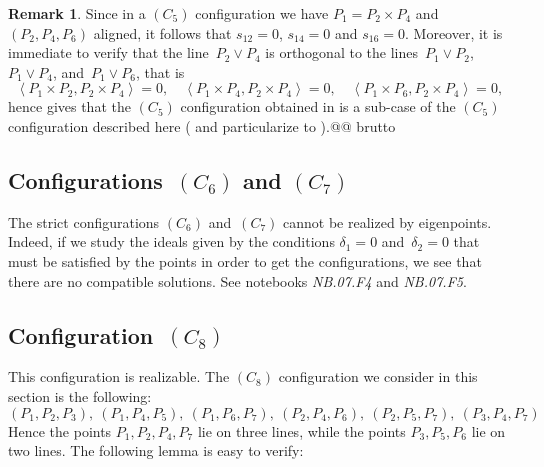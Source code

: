 \documentclass[a4paper, 11pt, reqno]{amsart}
\theoremstyle{plain}
\theoremstyle{definition}
\newtheorem{rmk}[lemma]{Remark}
\newcommand{\nb}[2]{\textsl{{NB}.{#1}.{#2}}}
\newcommand{\scl}[2]{\left\langle {#1}, {#2} \right\rangle}
\begin{document}
\begin{rmk}
\label{rmk:C5rk8}
Since in a $(C_5)$ configuration we have 
$P_1 = P_2 \times P_4$ and $(P_2, P_4, P_6)$ aligned, it follows that $s_{12} = 0$, $s_{14} = 0$ and $s_{16} = 0$.
Moreover, it is
immediate to verify that the line~$P_2 \vee P_4$ is orthogonal to the
lines~$P_1 \vee P_2$, $P_1 \vee P_4$, and~$P_1 \vee P_6$, that is
%
\[
  \scl{P_1 \times P_2}{P_2 \times P_4} = 0, \quad
  \scl{P_1 \times P_4}{P_2 \times P_4} = 0, \quad
  \scl{P_1 \times P_6}{P_2 \times P_4} = 0,
\]
hence  gives that the $(C_5)$ configuration obtained in  is a sub-case of the $(C_5)$ configuration described here ( and  particularize to ).@@ brutto
%
\end{rmk}
%

\subsection*{Configurations~\texorpdfstring{$(C_6)$}{C6} and \texorpdfstring{$(C_7)$}{C7}}

The strict configurations $(C_6)$ and~$(C_7)$ cannot be realized by eigenpoints.
Indeed, if we study the ideals given by the conditions
$\delta_1=0$ and~$\delta_2=0$ that must be satisfied by the points in order to get the configurations,
we see that there are no compatible solutions.
See notebooks \nb{07}{F4} and \nb{07}{F5}.

\subsection*{Configuration~\texorpdfstring{$(C_8)$}{C8}}
This configuration is realizable.  
The $(C_8)$ configuration we consider in this section is the following: 
%
\begin{equation}
\label{config:c8}
(P_1, P_2, P_3), \ (P_1, P_4, P_5), \ (P_1, P_6, P_7), \ (P_2, P_4, P_6), \ 
(P_2, P_5, P_7), \ (P_3, P_4, P_7)    
\end{equation}
%
Hence the points $P_1, P_2, P_4, P_7$ lie on three lines, while the points
$P_3, P_5, P_6$ lie on two lines.
The following lemma is easy to verify:
\end{document}
